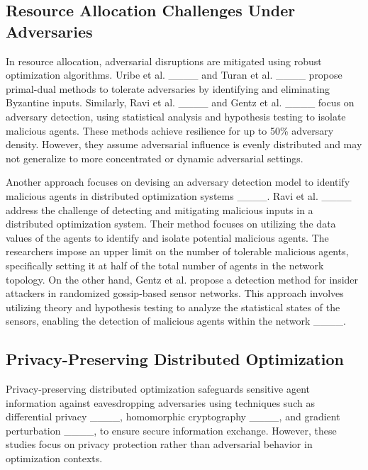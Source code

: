 \subsection{Resource Allocation Challenges Under Adversaries}
In resource allocation, adversarial disruptions are mitigated using robust optimization algorithms. Uribe et al. ____ and Turan et al. ____ propose primal-dual methods to tolerate adversaries by identifying and eliminating Byzantine inputs. Similarly, Ravi et al. ____ and Gentz et al. ____ focus on adversary detection, using statistical analysis and hypothesis testing to isolate malicious agents. These methods achieve resilience for up to 50\% adversary density. However, they assume adversarial influence is evenly distributed and may not generalize to more concentrated or dynamic adversarial settings.
 
Another approach focuses on devising an adversary detection model to identify malicious agents in distributed optimization systems ____. Ravi et al. ____ address the challenge of detecting and mitigating malicious inputs in a distributed optimization system. Their method focuses on utilizing the data values of the agents to identify and isolate potential malicious agents. The researchers impose an upper limit on the number of tolerable malicious agents, specifically setting it at half of the total number of agents in the network topology. On the other hand, Gentz et al. propose a detection method for insider attackers in randomized gossip-based sensor networks. This approach involves utilizing theory and hypothesis testing to analyze the statistical states of the sensors, enabling the detection of malicious agents within the network ____.

\subsection{Privacy-Preserving Distributed Optimization}
Privacy-preserving distributed optimization safeguards sensitive agent information against eavesdropping adversaries using techniques such as differential privacy ____, homomorphic cryptography ____, and gradient perturbation ____, to ensure secure information exchange. However, these studies focus on privacy protection rather than adversarial behavior in optimization contexts.

